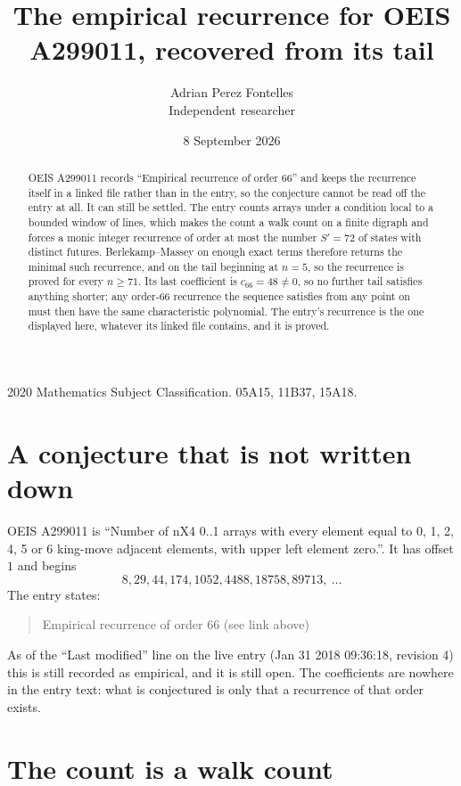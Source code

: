 \documentclass[11pt,a4paper]{article}
\title{The empirical recurrence for OEIS A299011, recovered from its tail}
\author{Adrian Perez Fontelles\\ \small Independent researcher}
\date{8 September 2026}
\theoremstyle{plain}
\theoremstyle{definition}
\begin{document}
\maketitle

\begin{abstract}
OEIS A299011 records ``Empirical recurrence of order $66$'' and keeps the recurrence itself in
a linked file rather than in the entry, so the conjecture cannot be read off the entry at all.
It can still be settled. The entry counts arrays under a condition local to a bounded window of
lines, which makes the count a walk count on a finite digraph and forces a monic integer
recurrence of order at most the number $S'=72$ of states with distinct futures. Berlekamp--Massey on
enough exact terms therefore returns the minimal such recurrence, and on the tail beginning at $n=5$, so the recurrence is proved for every $n\ge71$.
Its last coefficient is $c_{66}=48\neq0$, so no further tail satisfies anything
shorter; any order-$66$ recurrence the sequence satisfies from any point on must then have
the same characteristic polynomial. The entry's recurrence is the one displayed here, whatever
its linked file contains, and it is proved.
\end{abstract}

\noindent\small 2020 Mathematics Subject Classification. 05A15, 11B37, 15A18.\normalsize

\section{A conjecture that is not written down}

OEIS A299011 is ``Number of nX4 0..1 arrays with every element equal to 0, 1, 2, 4, 5 or 6 king-move adjacent elements, with upper left element zero.''. It has offset $1$ and begins
\[
8, 29, 44, 174, 1052, 4488, 18758, 89713,\ \dots
\]
The entry states:
\begin{quote}
Empirical recurrence of order 66 (see link above)
\end{quote}
As of the ``Last modified'' line on the live entry (Jan 31 2018 09:36:18, revision 4)
this is still recorded as empirical, and it is still open. The coefficients are nowhere in the
entry text: what is conjectured is only that a recurrence of that order exists.

\section{The count is a walk count}
\end{document}
